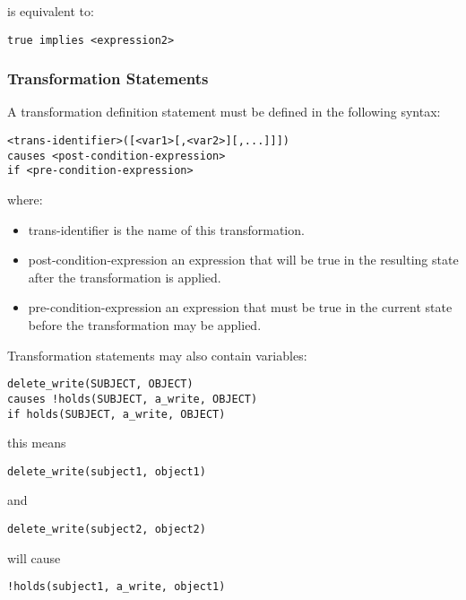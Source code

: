 \documentclass[a4paper,draft]{article}
\begin{document}
        is equivalent to:

\begin{verbatim}
true implies <expression2>
\end{verbatim}

      \subsubsection{Transformation Statements}

        A transformation definition statement must be defined in the following
        syntax:

\begin{verbatim}
<trans-identifier>([<var1>[,<var2>][,...]]])
causes <post-condition-expression>
if <pre-condition-expression>
\end{verbatim}

        where:

        \begin{itemize}
          \item
            trans-identifier is the name of this transformation.
          \item
            post-condition-expression an expression that will be true in the
            resulting state after the transformation is applied.
          \item
            pre-condition-expression an expression that must be true in the
            current state before the transformation may be applied.
        \end{itemize}


        Transformation statements may also contain variables:

\begin{verbatim}
delete_write(SUBJECT, OBJECT)
causes !holds(SUBJECT, a_write, OBJECT)
if holds(SUBJECT, a_write, OBJECT)
\end{verbatim}
        this means

\begin{verbatim}
delete_write(subject1, object1)
\end{verbatim}

        and

\begin{verbatim}
delete_write(subject2, object2)
\end{verbatim}

        will cause

\begin{verbatim}
!holds(subject1, a_write, object1)
\end{verbatim}
\end{document}
